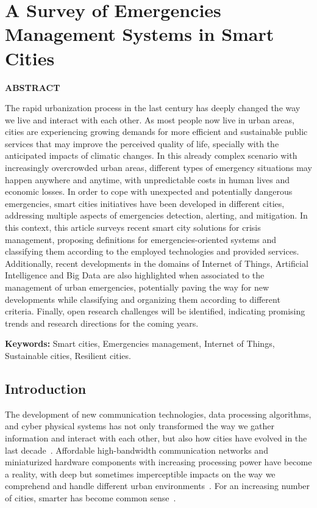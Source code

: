 \chapter{A Survey of Emergencies Management Systems in Smart Cities}\label{cap:survey}

\begin{refsection}

\textbf{ABSTRACT}

The rapid urbanization process in the last century has deeply changed the way we live and interact with each other. As most people now live in urban areas, cities are experiencing growing demands for more efficient and sustainable public services that may improve the perceived quality of life, specially with the anticipated impacts of climatic changes. In this already complex scenario with increasingly overcrowded urban areas, different types of emergency situations may happen anywhere and anytime, with unpredictable costs in human lives and economic losses. In order to cope with unexpected and potentially dangerous emergencies, smart cities initiatives have been developed in different cities, addressing multiple aspects of emergencies detection, alerting, and mitigation. In this context, this article surveys recent smart city solutions for crisis management, proposing definitions for emergencies-oriented systems and classifying them according to the employed technologies and provided services. Additionally, recent developments in the domains of Internet of Things, Artificial Intelligence and Big Data are also highlighted when associated to the management of urban emergencies, potentially paving the way for new developments while classifying and organizing them according to different criteria. Finally, open research challenges will be identified, indicating promising trends and research directions for the coming years.

\textbf{Keywords:} Smart cities, Emergencies management, Internet of Things, Sustainable cities, Resilient cities.

\section{Introduction}

The development of new communication technologies, data processing algorithms, and cyber physical systems has not only transformed the way we gather information and interact with each other, but also how cities have evolved in the last decade~\cite{smartcities1,smartcities7}. Affordable high-bandwidth communication networks and miniaturized hardware components with increasing processing power have become a reality, with deep but sometimes imperceptible impacts on the way we comprehend and handle different urban environments~\cite{smartcities2,smartcities3}. For an increasing number of cities, smarter has become common sense~\cite{smartcities8}.


\end{refsection}
